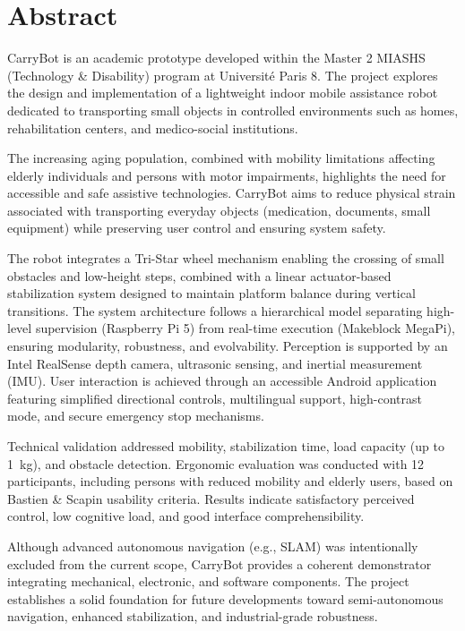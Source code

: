 \documentclass[12pt,a4paper]{article}
\begin{document}
\newpage


\section*{Abstract}

CarryBot is an academic prototype developed within the Master 2 MIASHS (Technology \& Disability) program at Universit\'e Paris 8. The project explores the design and implementation of a lightweight indoor mobile assistance robot dedicated to transporting small objects in controlled environments such as homes, rehabilitation centers, and medico-social institutions.

The increasing aging population, combined with mobility limitations affecting elderly individuals and persons with motor impairments, highlights the need for accessible and safe assistive technologies. CarryBot aims to reduce physical strain associated with transporting everyday objects (medication, documents, small equipment) while preserving user control and ensuring system safety.

The robot integrates a Tri-Star wheel mechanism enabling the crossing of small obstacles and low-height steps, combined with a linear actuator-based stabilization system designed to maintain platform balance during vertical transitions. The system architecture follows a hierarchical model separating high-level supervision (Raspberry Pi 5) from real-time execution (Makeblock MegaPi), ensuring modularity, robustness, and evolvability. Perception is supported by an Intel RealSense depth camera, ultrasonic sensing, and inertial measurement (IMU). User interaction is achieved through an accessible Android application featuring simplified directional controls, multilingual support, high-contrast mode, and secure emergency stop mechanisms.

Technical validation addressed mobility, stabilization time, load capacity (up to 1~kg), and obstacle detection. Ergonomic evaluation was conducted with 12 participants, including persons with reduced mobility and elderly users, based on Bastien \& Scapin usability criteria. Results indicate satisfactory perceived control, low cognitive load, and good interface comprehensibility.

Although advanced autonomous navigation (e.g., SLAM) was intentionally excluded from the current scope, CarryBot provides a coherent demonstrator integrating mechanical, electronic, and software components. The project establishes a solid foundation for future developments toward semi-autonomous navigation, enhanced stabilization, and industrial-grade robustness.\\
\end{document}
